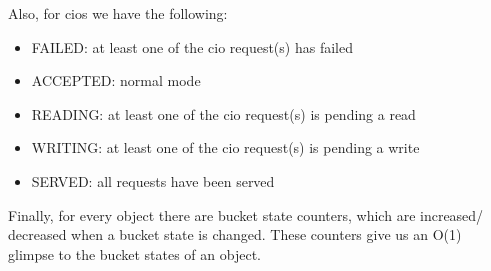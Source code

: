 Also, for cios we have the following:

\begin{itemize}
	\item FAILED: at least one of the cio request(s) has failed
	\item ACCEPTED: normal mode
	\item READING: at least one of the cio request(s) is pending a read
	\item WRITING: at least one of the cio request(s) is pending a write
	\item SERVED: all requests have been served
\end{itemize}


Finally, for every object there are bucket state counters, which are increased/
decreased when a bucket state is changed. These counters give us an O(1)
glimpse to the bucket states of an object.


